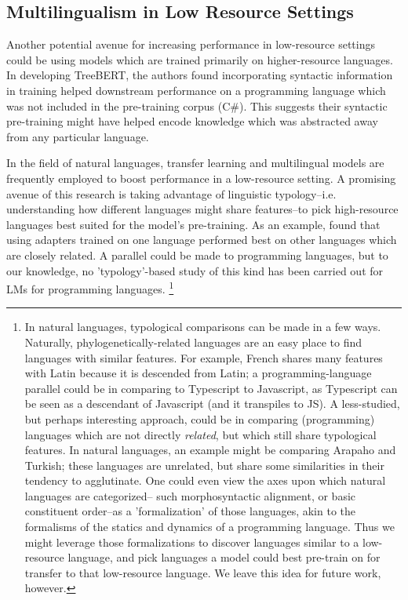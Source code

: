 \documentclass[acmlarge]{acmart}
\begin{document}
\subsection{Multilingualism in Low Resource Settings}

Another potential avenue for increasing performance in low-resource settings could be using models which are trained primarily on higher-resource languages. In developing TreeBERT, \cite{TreeBERT} the authors found incorporating syntactic information in training helped downstream performance on a programming language which was not included in the pre-training corpus (C#). This suggests their syntactic pre-training might have helped encode knowledge which was abstracted away from any particular language.

In the field of natural languages, transfer learning and multilingual models are frequently employed to boost performance in a low-resource setting. A promising avenue of this research is taking advantage of linguistic typology--i.e. understanding how different languages might share features--to pick high-resource languages best suited for the model's pre-training. As an example, \cite{faisal2022phylogenyinspired} found that using adapters trained on one language performed best on other languages which are closely related. A parallel could be made to programming languages, but to our knowledge, no 'typology'-based study of this kind has been carried out for LMs for programming languages. \footnote{In natural languages, typological comparisons can be made in a few ways. Naturally, phylogenetically-related languages are an easy place to find languages with similar features. For example, French shares many features with Latin because it is descended from Latin; a programming-language parallel could be in comparing  to Typescript to Javascript, as Typescript can be seen as a descendant of Javascript (and it transpiles to JS). A less-studied, but perhaps interesting approach, could be in comparing (programming) languages which are not directly \emph{related}, but which still share typological features. In natural languages, an example might be comparing Arapaho and Turkish; these languages are unrelated, but share some similarities in their tendency to agglutinate. One could even view the axes upon which natural languages are categorized-- such morphosyntactic alignment, or basic constituent order--as a 'formalization' of those languages, akin to the formalisms of the statics and dynamics of a programming language. Thus we might leverage those formalizations to discover languages similar to a low-resource language, and pick languages a model could best pre-train on for transfer to that low-resource language. We leave this idea for future work, however.}




\end{document}
